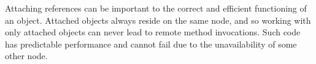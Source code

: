 Attaching references can be important to the correct and efficient
functioning of an object. Attached objects always reside on the same
node, and so working with only attached objects can never lead to
remote method invocations. Such code has predictable performance and
cannot fail due to the unavailability of some other node.




